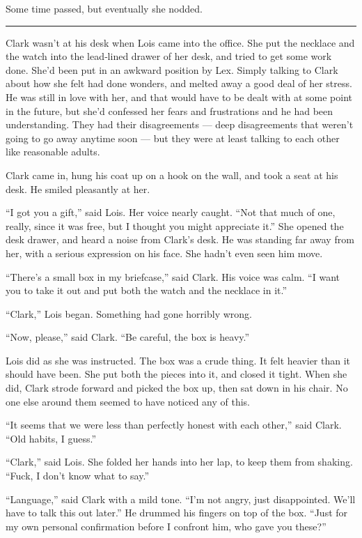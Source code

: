 Some time passed, but eventually she nodded.

\begin{center}\rule{0.5\linewidth}{0.5pt}\end{center}

Clark wasn't at his desk when Lois came into the office. She put the
necklace and the watch into the lead‐lined drawer of her desk, and tried
to get some work done. She'd been put in an awkward position by Lex.
Simply talking to Clark about how she felt had done wonders, and melted
away a good deal of her stress. He was still in love with her, and that
would have to be dealt with at some point in the future, but she'd
confessed her fears and frustrations and he had been understanding. They
had their disagreements --- deep disagreements that weren't going to go
away anytime soon --- but they were at least talking to each other like
reasonable adults.

Clark came in, hung his coat up on a hook on the wall, and took a seat
at his desk. He smiled pleasantly at her.

``I got you a gift,'' said Lois. Her voice nearly caught. ``Not that
much of one, really, since it was free, but I thought you might
appreciate it.'' She opened the desk drawer, and heard a noise from
Clark's desk. He was standing far away from her, with a serious
expression on his face. She hadn't even seen him move.

``There's a small box in my briefcase,'' said Clark. His voice was calm.
``I want you to take it out and put both the watch and the necklace in
it.''

``Clark,'' Lois began. Something had gone horribly wrong.

``Now, please,'' said Clark. ``Be careful, the box is heavy.''

Lois did as she was instructed. The box was a crude thing. It felt
heavier than it should have been. She put both the pieces into it, and
closed it tight. When she did, Clark strode forward and picked the box
up, then sat down in his chair. No one else around them seemed to have
noticed any of this.

``It seems that we were less than perfectly honest with each other,''
said Clark. ``Old habits, I guess.''

``Clark,'' said Lois. She folded her hands into her lap, to keep them
from shaking. ``Fuck, I don't know what to say.''

``Language,'' said Clark with a mild tone. ``I'm not angry, just
disappointed. We'll have to talk this out later.'' He drummed his
fingers on top of the box. ``Just for my own personal confirmation
before I confront him, who gave you these?''

